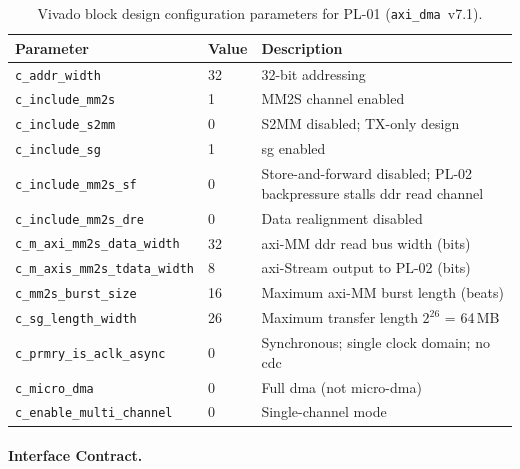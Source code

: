 \begin{table}[htbp]
  \caption{Vivado block design configuration parameters for PL-01
           (\texttt{axi\_dma}~v7.1).}
  \label{tab:ipconfig_pl01}
  \centering
  \small
  \begin{tabular}{l l p{7.5cm}}
    \hline
    Parameter & Value & Description \\
    \hline
    \texttt{c\_addr\_width}
      & 32 & 32-bit addressing \\
    \texttt{c\_include\_mm2s}
      & 1  & MM2S channel enabled \\
    \texttt{c\_include\_s2mm}
      & 0  & S2MM disabled; TX-only design \\
    \texttt{c\_include\_sg}
      & 1  & \ac{sg} enabled \\
    \texttt{c\_include\_mm2s\_sf}
      & 0  & Store-and-forward disabled; PL-02 backpressure
             stalls \ac{ddr} read channel \\
    \texttt{c\_include\_mm2s\_dre}
      & 0  & Data realignment disabled \\
    \texttt{c\_m\_axi\_mm2s\_data\_width}
      & 32 & \ac{axi}-MM \ac{ddr} read bus width (bits) \\
    \texttt{c\_m\_axis\_mm2s\_tdata\_width}
      & 8  & \ac{axi}-Stream output to PL-02 (bits) \\
    \texttt{c\_mm2s\_burst\_size}
      & 16 & Maximum \ac{axi}-MM burst length (beats) \\
    \texttt{c\_sg\_length\_width}
      & 26 & Maximum transfer length $2^{26}$ = 64\,MB \\
    \texttt{c\_prmry\_is\_aclk\_async}
      & 0  & Synchronous; single clock domain; no \ac{cdc} \\
    \texttt{c\_micro\_dma}
      & 0  & Full \ac{dma} (not micro-\ac{dma}) \\
    \texttt{c\_enable\_multi\_channel}
      & 0  & Single-channel mode \\
    \hline
  \end{tabular}
\end{table}
\FloatBarrier


\FloatBarrier
\paragraph{Interface Contract.}

